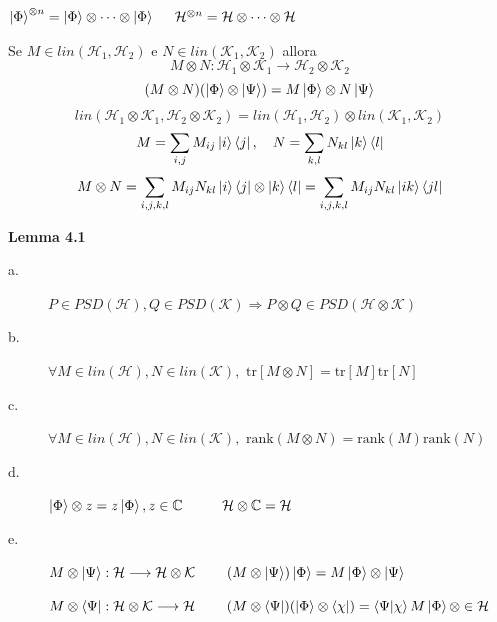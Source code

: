 \documentclass{report}
\begin{document}
\medskip
$\ket{\Phi} ^{\otimes n} = \ket{\Phi} \otimes \dots \otimes \ket{\Phi} \hspace{0.5cm} \mathcal{H}^{\otimes n} = \mathcal{H} \otimes\dots\otimes\mathcal{H}$

\medskip
Se $M \in \textit{lin}(\mathcal{H}_1,\mathcal{H}_2)$ e $N \in \textit{lin}(\mathcal{K}_1,\mathcal{K}_2)$ allora
$$M\otimes N : \mathcal{H}_1 \otimes \mathcal{K}_1 \longrightarrow \mathcal{H}_2 \otimes \mathcal{K}_2 $$
$$(M \otimes N) (\ket{ \Phi} \otimes \ket{\Psi}) = M\ket{\Phi} \otimes N \ket{\Psi}$$
$$\textit{lin}(\mathcal{H}_1\otimes\mathcal{K}_1,\mathcal{H}_2\otimes\mathcal{K}_2) = \textit{lin}(\mathcal{H}_1,\mathcal{H}_2) \otimes \textit{lin}(\mathcal{K}_1,\mathcal{K}_2)$$
$$M = \sum_{i,j}M_{ij}\ket{i}\bra{j}, \quad N = \sum_{k,l} N_{kl} \ket{k}\bra{l}$$
$$M \otimes N = \sum_{i,j,k,l} M_{ij} N_{kl}\ket{i}\bra{j} \otimes \ket{k}\bra{l} = \sum_{i,j,k,l} M_{ij} N_{kl}\ket{ik}\bra{jl}$$

\textbf{Lemma 4.1}
\begin{description}
    \item[a.] $P \in \textit{PSD}(\mathcal{H}), Q \in \textit{PSD}(\mathcal{K}) \Rightarrow P \otimes Q \in \textit{PSD}(\mathcal{H}\otimes\mathcal{K})$
    \item[b.] $\forall M \in \textit{lin}(\mathcal{H}), N \in \textit{lin}(\mathcal{K}), \text{ tr}[M\otimes N] = \text{tr}[M]\text{tr}[N]$
    \item[c.] $\forall M \in \textit{lin}(\mathcal{H}), N \in \textit{lin}(\mathcal{K}), \text{ rank}(M\otimes N) = \text{rank}(M)\text{rank}(N)$
    \item[d.] $\ket{\Phi}\otimes z = z\ket{\Phi}, z \in \mathbb{C} \hspace{1cm}\mathcal{H} \otimes \mathbb{C}= \mathcal{H}$
    \item[e.] $M\otimes \ket{\Psi}: \mathcal{H} \longrightarrow \mathcal{H} \otimes \mathcal{K} \hspace{0.8cm} (M\otimes \ket{\Psi})\ket{\Phi} = M \ket{\Phi} \otimes \ket{\Psi}$
    
    \medskip
    $M\otimes \bra{\Psi}: \mathcal{H} \otimes \mathcal{K} \longrightarrow \mathcal{H} \hspace{0.8cm} (M\otimes \bra{\Psi}) (\ket{\Phi}\otimes\bra{\chi}) = \braket{\Psi|\chi} M \ket{\Phi} \otimes \in \mathcal{H}$
\end{description}
\end{document}
